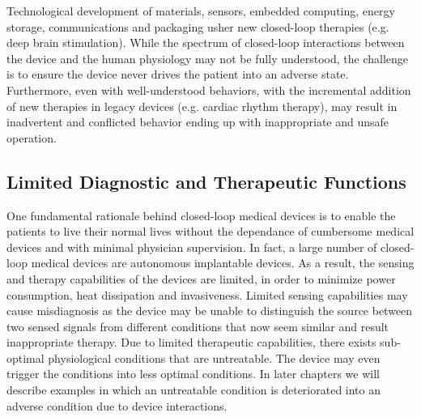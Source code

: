 \documentclass[a4paper]{article}
\begin{document}
Technological development of materials, sensors, embedded computing, energy storage, communications and packaging usher new closed-loop therapies (e.g. deep brain stimulation). While the spectrum of closed-loop interactions between the device and the human physiology may not be fully understood, the challenge is to ensure the device never drives the patient into an adverse state. Furthermore, even with well-understood behaviors, with the incremental addition of new therapies in legacy devices (e.g. cardiac rhythm therapy), may result in inadvertent and conflicted behavior ending up with inappropriate and unsafe operation. 

\subsection{Limited Diagnostic and Therapeutic Functions}
One fundamental rationale behind closed-loop medical devices is to enable the patients to live their normal lives without the dependance of cumbersome medical devices and with minimal physician supervision. In fact, a large number of closed-loop medical devices are autonomous implantable devices. As a result, the sensing and therapy capabilities of the devices are limited, in order to minimize power consumption, heat dissipation and invasiveness. Limited sensing capabilities may cause misdiagnosis as the device may be unable to distinguish the source between two sensed signals from different conditions that now seem similar and result inappropriate therapy. Due to limited therapeutic capabilities, there exists sub-optimal physiological conditions that are untreatable. The device may even trigger the conditions into less optimal conditions. In later chapters we will describe examples in which an untreatable condition is deteriorated into an adverse condition due to device interactions.
\end{document}
